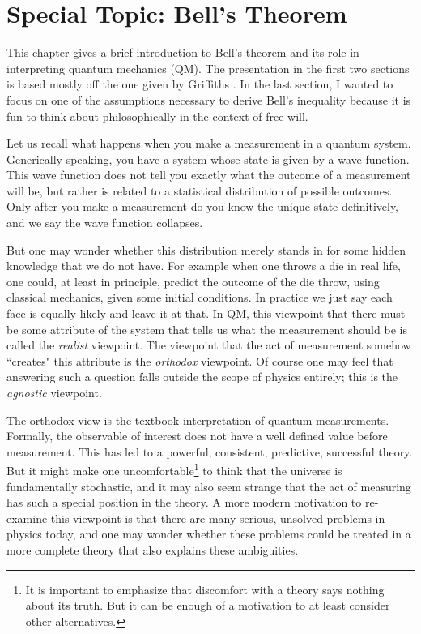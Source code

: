 \chapter{Special Topic: Bell's Theorem}\label{ap:bell}

This chapter gives a brief introduction to Bell's theorem and its role in
interpreting quantum mechanics (QM). The presentation in the first two sections
is based mostly off the one given by Griffiths 
\cite{griffiths_introduction_2005}. In the last section, I wanted to focus
on one of the assumptions necessary to derive Bell's inequality because
it is fun to think about philosophically in the context of free will.

Let us recall what happens when you make a measurement in a quantum system.
Generically speaking, you have a system whose state is given by a wave
function. This wave function does not tell you exactly what the
outcome of a measurement will be, but rather is related to a statistical
distribution of possible outcomes. Only after you make a measurement do
you know the unique state definitively, and we say the wave function collapses.

But one may wonder whether this distribution merely stands in for some
hidden knowledge that we do not have. For example when one throws a die
in real life, one could, at least in principle, predict the outcome of
the die throw, using classical mechanics, given some initial conditions.
In practice we just say each face is equally likely and leave it at that.
In QM, this viewpoint that there must be some attribute
of the system that tells us what the measurement should be is called
the {\it realist} viewpoint. The viewpoint that the act of measurement
somehow ``creates" this attribute is the {\it orthodox} viewpoint.
Of course one may feel that answering such a question falls outside the
scope of physics entirely; this is the {\it agnostic} viewpoint.

The orthodox view is the textbook interpretation of quantum
measurements. Formally, the observable of interest does not have a
well defined value before measurement. This has led to a powerful,
consistent, predictive, successful theory. But it might make one 
uncomfortable\footnote{It is important to emphasize that discomfort
with a theory says nothing about its truth. But it can be enough of
a motivation to at least consider other alternatives.} to
think that the universe is fundamentally stochastic, and it
may also seem strange that the act of measuring has such a special
position in the theory. A more modern motivation to re-examine this
viewpoint is that there are many serious, unsolved problems in physics today,
and one may wonder whether these problems could be treated in a
more complete theory that also explains these ambiguities.

